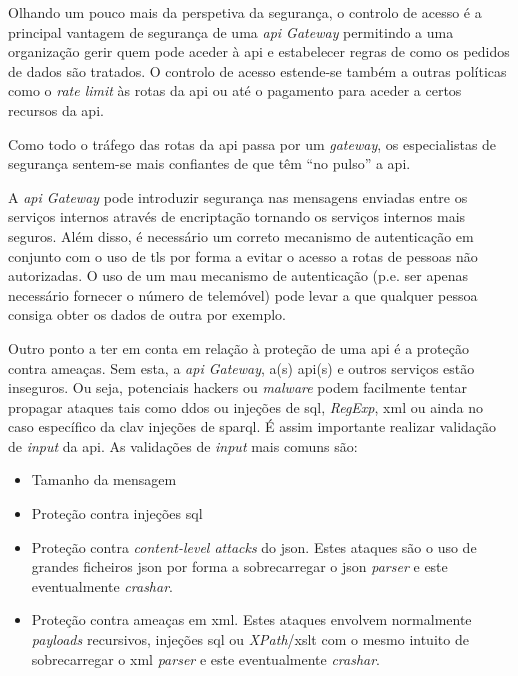 Olhando um pouco mais da perspetiva da segurança, o controlo de acesso é a principal vantagem de segurança de uma \textit{\acrshort{api} Gateway} permitindo a uma organização gerir quem pode aceder à \acrshort{api} e estabelecer regras de como os pedidos de dados são tratados. O controlo de acesso estende-se também a outras políticas como o \textit{rate limit} às rotas da \acrshort{api} ou até o pagamento para aceder a certos recursos da \acrshort{api}.

Como todo o tráfego das rotas da \acrshort{api} passa por um \textit{gateway}, os especialistas de segurança sentem-se mais confiantes de que têm ``no pulso'' a \acrshort{api}.~\cite{apiGatInfo}

A \textit{\acrshort{api} Gateway} pode introduzir segurança nas mensagens enviadas entre os serviços internos através de encriptação tornando os serviços internos mais seguros. Além disso, é necessário um correto mecanismo de autenticação em conjunto com o uso de \acrshort{tls} por forma a evitar o acesso a rotas de pessoas não autorizadas. O uso de um mau mecanismo de autenticação (p.e. ser apenas necessário fornecer o número de telemóvel) pode levar a que qualquer pessoa consiga obter os dados de outra por exemplo.

Outro ponto a ter em conta em relação à proteção de uma \acrshort{api} é a proteção contra ameaças. Sem esta, a \textit{\acrshort{api} Gateway}, a(s) \acrshort{api}(s) e outros serviços estão inseguros. Ou seja, potenciais hackers ou \textit{malware} podem facilmente tentar propagar ataques tais como \acrshort{ddos} ou injeções de \acrshort{sql}, \textit{RegExp}, \acrshort{xml} ou ainda no caso específico da \acrshort{clav} injeções de \acrshort{sparql}. É assim importante realizar validação de \textit{input} da \acrshort{api}. As validações de \textit{input} mais comuns são:
\begin{itemize}
    \item Tamanho da mensagem
    \item Proteção contra injeções \acrshort{sql}
    \item Proteção contra \textit{content-level attacks} do \acrshort{json}. Estes ataques são o uso de grandes ficheiros \acrshort{json} por forma a sobrecarregar o \acrshort{json} \textit{parser} e este eventualmente \textit{crashar}.
    \item Proteção contra ameaças em \acrshort{xml}. Estes ataques envolvem normalmente \textit{payloads} recursivos, injeções \acrshort{sql} ou \textit{XPath}/\acrshort{xslt} com o mesmo intuito de sobrecarregar o \acrshort{xml} \textit{parser} e este eventualmente \textit{crashar}.
\end{itemize}

